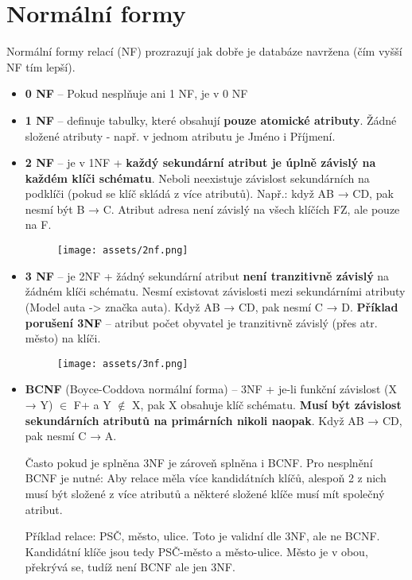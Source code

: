 \section{Normální formy}
Normální formy relací (NF) prozrazují jak dobře je databáze navržena (čím vyšší NF tím lepší).
\begin{itemize}
    \item \textbf{0 NF} -- Pokud nesplňuje ani 1 NF, je v 0 NF
    \item \textbf{1 NF} -- definuje tabulky, které obsahují \textbf{pouze atomické atributy}. Žádné složené atributy - např. v jednom atributu je Jméno i Příjmení.
    \item \textbf{2 NF} -- je v 1NF + \textbf{každý sekundární atribut je úplně závislý na každém klíči schématu}. Neboli neexistuje závislost sekundárních na podklíči (pokud se klíč skládá z více atributů). Např.: když AB → CD, pak nesmí být B → C. Atribut adresa není závislý na všech klíčích FZ, ale pouze na F.
          \begin{figure}[H]
              \centering
              \texttt{[image: assets/2nf.png]}
          \end{figure}
    \item \textbf{3 NF} -- je 2NF + žádný sekundární atribut \textbf{není tranzitivně závislý} na žádném klíči schématu. Nesmí existovat závislosti mezi sekundárními atributy (Model auta -> značka auta). Když AB → CD, pak nesmí C  → D. \textbf{Příklad porušení 3NF} -- atribut počet obyvatel je tranzitivně závislý (přes atr. město) na klíči.
          \begin{figure}[H]
              \centering
              \texttt{[image: assets/3nf.png]}
          \end{figure}
    \item \textbf{BCNF} (Boyce-Coddova normální forma) -- 3NF + je-li funkční závislost (X → Y) $\in$ F+ a Y $\notin$ X, pak X obsahuje klíč schématu. \textbf{Musí být závislost sekundárních atributů na primárních nikoli naopak}. Když AB → CD, pak nesmí C  → A.

          Často pokud je splněna 3NF je zároveň splněna i BCNF. Pro nesplnění BCNF je nutné: Aby relace měla více kandidátních klíčů, alespoň 2 z nich musí být složené z více atributů a některé složené klíče musí mít společný atribut.

          Příklad relace: PSČ, město, ulice. Toto je validní dle 3NF, ale ne BCNF. Kandidátní klíče jsou tedy PSČ-město a město-ulice. Město je v obou, překrývá se, tudíž není BCNF ale jen 3NF.
\end{itemize}